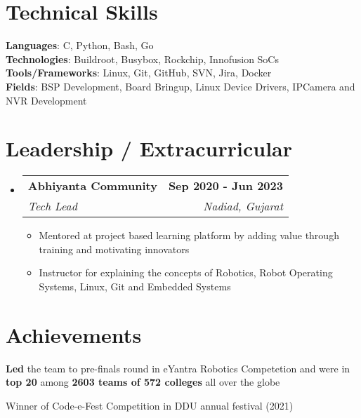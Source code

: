 \documentclass[letterpaper,11pt]{article}
\makeatletter
\newcommand{\resumeItem}[1]{
  \item\small{
    {#1 \vspace{-2pt}}
  }
}
\newcommand{\resumeSubheading}[4]{
  \vspace{-2pt}\item
    \begin{tabular*}{1.0\textwidth}[t]{l@{\extracolsep{\fill}}r}
      \textbf{#1} & \textbf{\small #2} \\
      \textit{\small#3} & \textit{\small #4} \\
    \end{tabular*}\vspace{-7pt}
}
\newcommand{\resumeSubHeadingListStart}{\begin{itemize}[leftmargin=0.0in, label={}]}
\newcommand{\resumeSubHeadingListEnd}{\end{itemize}}
\newcommand{\resumeItemListStart}{\begin{itemize}}
\newcommand{\resumeItemListEnd}{\end{itemize}\vspace{-5pt}}
\makeatother
\begin{document}
\section{Technical Skills}
 \begin{itemize}[leftmargin=0.15in, label={}]
    \small{\item{
     \textbf{Languages}{: C, Python, Bash, Go} \\
     \textbf{Technologies}{: Buildroot, Busybox, Rockchip, Innofusion SoCs} \\
     \textbf{Tools/Frameworks}{: Linux, Git, GitHub, SVN, Jira, Docker} \\
     \textbf{Fields}{: BSP Development, Board Bringup, Linux Device Drivers, IPCamera and NVR Development} \\
    }}
 \end{itemize}
 \vspace{-10pt}


\section{Leadership / Extracurricular}
    \resumeSubHeadingListStart
        \resumeSubheading{Abhiyanta Community}{Sep 2020 - Jun 2023}{Tech Lead}{Nadiad, Gujarat}
            \resumeItemListStart
                \resumeItem{Mentored at project based learning platform by adding value through training and motivating innovators}
                \resumeItem{Instructor for explaining the concepts of Robotics, Robot Operating Systems, Linux, Git and Embedded Systems}
            \resumeItemListEnd
    \resumeSubHeadingListEnd
\vspace{-10pt}

\section{Achievements}
 \begin{itemize}[leftmargin=0.15in]
    \small{\setlength{\itemsep}{-3pt}
        \item{\textbf{Led} the team to pre-finals round in eYantra Robotics Competetion and were in \textbf{top 20} among \textbf{2603 teams of 572 colleges} all over the globe}
        \item{Winner of Code-e-Fest Competition in DDU annual festival (2021)}
    }
 \end{itemize}
\end{document}
